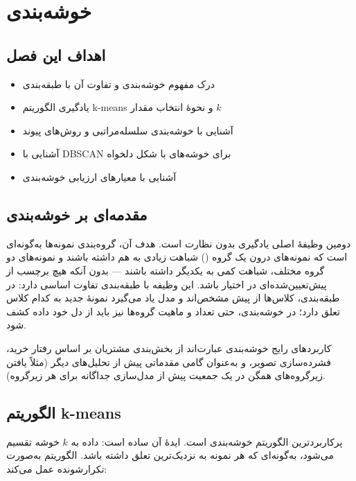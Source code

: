 \chapter{خوشه‌بندی}
\label{ch:clustering}

\section*{اهداف این فصل}
\begin{itemize}
    \item درک مفهوم خوشه‌بندی و تفاوت آن با طبقه‌بندی
    \item یادگیری الگوریتم k-means و نحوهٔ انتخاب مقدار $k$
    \item آشنایی با خوشه‌بندی سلسله‌مراتبی و روش‌های پیوند
    \item آشنایی با DBSCAN برای خوشه‌های با شکل دلخواه
    \item آشنایی با معیارهای ارزیابی خوشه‌بندی
\end{itemize}

\section{مقدمه‌ای بر خوشه‌بندی}

 دومین وظیفهٔ اصلی یادگیری بدون
نظارت است. هدف آن، گروه‌بندی نمونه‌ها به‌گونه‌ای است که نمونه‌های درون
یک گروه () شباهت زیادی به هم داشته باشند و
نمونه‌های دو گروه مختلف، شباهت کمی به یکدیگر داشته باشند — بدون آنکه
هیچ برچسب از پیش‌تعیین‌شده‌ای در اختیار باشد. این وظیفه با طبقه‌بندی
تفاوت اساسی دارد: در طبقه‌بندی، کلاس‌ها از پیش مشخص‌اند و مدل یاد
می‌گیرد نمونهٔ جدید به کدام کلاس تعلق دارد؛ در خوشه‌بندی، حتی تعداد و
ماهیت گروه‌ها نیز باید از دل خود داده کشف شود.

کاربردهای رایج خوشه‌بندی عبارت‌اند از بخش‌بندی مشتریان بر اساس رفتار
خرید، فشرده‌سازی تصویر، و به‌عنوان گامی مقدماتی پیش از تحلیل‌های دیگر
(مثلاً یافتن زیرگروه‌های همگن در یک جمعیت پیش از مدل‌سازی جداگانه برای
هر زیرگروه).

\section{الگوریتم k-means}

 پرکاربردترین
الگوریتم خوشه‌بندی است. ایدهٔ آن ساده است: داده به $k$ خوشه تقسیم
می‌شود، به‌گونه‌ای که هر نمونه به نزدیک‌ترین
 تعلق داشته باشد. الگوریتم به‌صورت
تکرارشونده عمل می‌کند:

